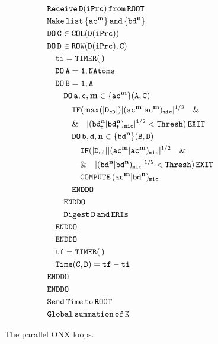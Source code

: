 \documentclass[prl,twocolumn,twocolumngrid,superbib]{revtex4} %
\begin{document}
\begin{figure}[htbp]
  \centering
  \caption{\protect
    The parallel ONX loops.
  }\label{Fig:ONXcore}
  \begin{equation*}
    \begin{split}
      &\tt        Receive\,D(iPrc)\,from\,ROOT\\
      &\tt        Make\,list\,\{ac^\mathbf{m}\}\,and\,\{bd^\mathbf{n}\} \\
      &\tt        DO\,C\in COL(D(iPrc)) \\
      &\tt        DO\,D\in ROW(D(iPrc),C) \\
      &\tt\quad     ti=TIMER(\,) \\
      &\tt\quad     DO\,A=1,NAtoms \\
      &\tt\quad     DO\,B=1,A \\
      &\tt\qquad      DO\,a,c,\mathbf{m}\in\{ac^\mathbf{m}\}(A,C) \\
      &\tt\qquad\quad   IF(\max(|D_{cD}|)|(ac^\mathbf{m}|ac^\mathbf{m})_{mic}|^{1/2}\quad\&\\
      &\tt\qquad\quad    \&\quad|(bd_f^\mathbf{n}|bd_f^\mathbf{n})_{mic}|^{1/2}<Thresh)\,EXIT  \\
      &\tt\qquad\quad   DO\,b,d,\mathbf{n}\in\{bd^\mathbf{n}\}(B,D) \\
      &\tt\qquad\qquad    IF(|D_{cd}||(ac^\mathbf{m}|ac^\mathbf{m})_{mic}|^{1/2}\quad\&\\
      &\tt\qquad\qquad    \&\quad|(bd^\mathbf{n}|bd^\mathbf{n})_{mic}|^{1/2}<Thresh)\,EXIT  \\
      &\tt\qquad\qquad    COMPUTE\,(ac^\mathbf{m}|bd^\mathbf{n})_{mic} \\
      &\tt\qquad\quad   ENDDO \\
      &\tt\qquad      ENDDO \\
      &\tt\qquad      Digest\,D\,and\,ERIs \\
      &\tt\quad     ENDDO \\
      &\tt\quad     ENDDO \\
      &\tt\quad     tf=TIMER(\,) \\
      &\tt\quad     Time(C,D)=tf-ti \\
      &\tt        ENDDO \\
      &\tt        ENDDO \\
      &\tt        Send\,Time\,to\,ROOT \\
      &\tt        Global\,summation\,of\,K 
    \end{split}
  \end{equation*}
\end{figure}
\end{document}
